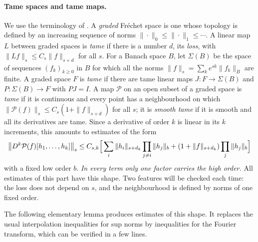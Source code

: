 \paragraph{Tame spaces and tame maps.}
We use the terminology of \cite[Part~II]{Hamilton1982}. A
\emph{graded} Fr\'echet space is one whose topology is defined by an
increasing sequence of norms $\|\cdot\|_0\le\|\cdot\|_1\le\cdots$. A
linear map $L$ between graded spaces is \emph{tame} if there is a
number $d$, its \emph{loss}, with $\|Lf\|_s\le C_s\|f\|_{s+d}$ for
all $s$. For a Banach space $B$, let $\Sigma(B)$ be the space of
sequences $(f_k)_{k\ge0}$ in $B$ for which all the norms
$\|f\|_s=\sum_ke^{sk}\|f_k\|_B$ are finite. A graded space $F$ is
\emph{tame} if there are tame linear maps $J:F\to\Sigma(B)$ and
$P:\Sigma(B)\to F$ with $PJ=I$. A map $\mathcal P$ on an open subset
of a graded space is \emph{tame} if it is continuous and every point
has a neighbourhood on which
$\|\mathcal P(f)\|_s\le C_s(1+\|f\|_{s+d})$ for all $s$; it is
\emph{smooth tame} if it is smooth and all its derivatives are tame.
Since a derivative of order $k$ is linear in its $k$ increments, this
amounts to estimates of the form
\begin{equation}\label{eq:tame-derivative-shape}
 \bigl\|D^k\mathcal P(f)[h_1,\ldots,h_k]\bigr\|_s
 \le C_{s,k}\Bigl[\,\sum_{i}\|h_i\|_{s+d_k}\prod_{j\ne i}\|h_j\|_{b}
       +(1+\|f\|_{s+d_k})\prod_{j}\|h_j\|_{b}\Bigr]
\end{equation}
with a fixed low order $b$. \emph{In every term only one factor
carries the high order.} All estimates of this part have this shape.
Two features will be checked each time: the loss does not depend on
$s$, and the neighbourhood is defined by norms of one fixed order.

The following elementary lemma produces estimates of this shape. It
replaces the usual interpolation inequalities for sup norms by
inequalities for the Fourier transform, which can be verified in a
few lines.


